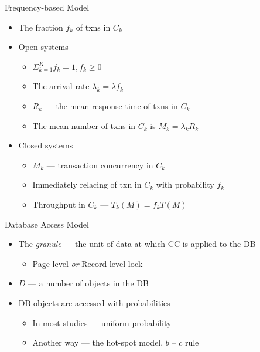 \documentclass[sans]{beamer}
\begin{document}
\begin{frame}{Frequency-based Model}
  \begin{itemize}
    \item The fraction $f_k$  of txns in $C_k$
    \vfill

    \item Open systems
    \begin{itemize}
      \item $\Sigma^K_{k = 1} f_k = 1, f_k \geq 0$
      \item The arrival rate $\lambda_k = \lambda f_k$
      \item $R_k$ --- the mean response time of txns in $C_k$
      \item The mean number of txns in $C_k$ is $M_k = \lambda_kR_k$
    \end{itemize}
    \vfill
    \item Closed systems
    \begin{itemize}
      \item $M_k$ --- transaction concurrency in $C_k$
      \item Immediately relacing of txn in $C_k$ with probability $f_k$
      \item Throughput in $C_k$ --- $T_k(M) = f_k T(M)$
    \end{itemize}
  \end{itemize}
\end{frame}

\begin{frame}{Database Access Model}
  \begin{itemize}
    \item The \emph{granule} --- the unit of data at which CC is applied to the DB
    \begin{itemize}
      \item Page-level \emph{or} Record-level lock
    \end{itemize}
    \item $D$ --- a number of objects in the DB
    \item DB objects are accessed with probabilities
    \begin{itemize}
      \item In most studies --- uniform probability
      \item Another way --- the hot-spot model, $b$ -- $c$ rule 
    \end{itemize}
  \end{itemize}
\end{frame}
\end{document}
